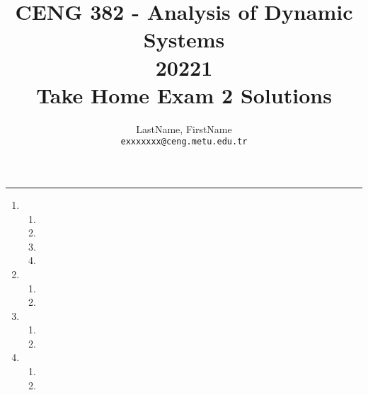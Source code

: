 \documentclass[12pt,a4paper, margin=1in]{article}
\author{
  LastName, FirstName\\
  \texttt{exxxxxxx@ceng.metu.edu.tr}
}
\title{CENG 382 - Analysis of Dynamic Systems \\
20221\\
Take Home Exam 2 Solutions}
\begin{document}
\maketitle

\noindent\rule{19cm}{1.2pt}

\begin{enumerate}

    \item %
        \begin{enumerate}
            \item 
            \item 
            \item 
            \item 
        \end{enumerate}
        
        
    \item %
        \begin{enumerate}
            \item 
            \item 
        \end{enumerate}
        
        
    \item %
        \begin{enumerate}
            \item 
            \item 
        \end{enumerate}
        
        
    \item %
        \begin{enumerate}
            \item 
            \item 
        \end{enumerate}


\end{enumerate}
\end{document}
